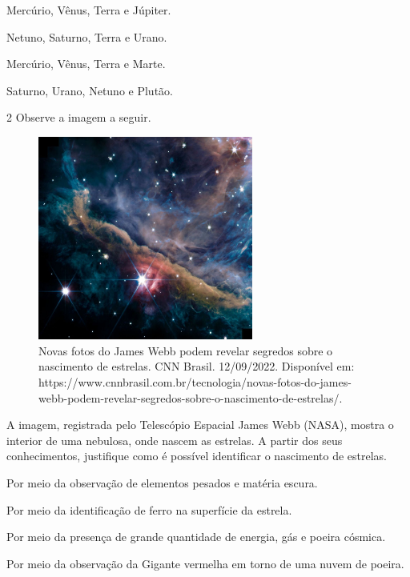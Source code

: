 \begin{escolha}
\item
  Mercúrio, Vênus, Terra e Júpiter.
\item
  Netuno, Saturno, Terra e Urano.
\item
  Mercúrio, Vênus, Terra e Marte.
\item
  Saturno, Urano, Netuno e Plutão.
\end{escolha}


\num{2} Observe a imagem a seguir.

\begin{figure}[htpb!]
\includegraphics[width=2.77865in,height=2.63750in]{./imgs/img13.jpg}
\caption{Novas fotos do James Webb podem revelar segredos sobre o nascimento de estrelas. CNN Brasil. 12/09/2022. Disponível em: https://www.cnnbrasil.com.br/tecnologia/novas-fotos-do-james-webb-podem-revelar-segredos-sobre-o-nascimento-de-estrelas/.}
\end{figure}

A imagem, registrada pelo Telescópio Espacial James Webb (NASA), mostra o
interior de uma nebulosa, onde nascem as estrelas. A partir dos seus
conhecimentos, justifique como é possível identificar o nascimento de
estrelas.

\begin{escolha}
\item
  Por meio da observação de elementos pesados e matéria escura.
\item
  Por meio da identificação de ferro na superfície da estrela.
\item
  Por meio da presença de grande quantidade de energia, gás e poeira cósmica.
\item
 Por meio da observação da Gigante vermelha em torno de uma nuvem de poeira.
\end{escolha}

